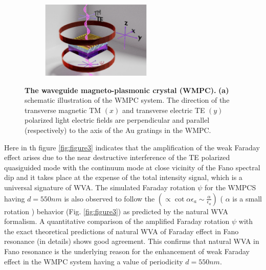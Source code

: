 \documentclass[13pt]{article}
\begin{document}
	\begin{figure}[hbt!]
		\centering
		\begin{subfigure}[]{.49 \linewidth}
			\centering
			\includegraphics[width=\linewidth, height=140px]{Figures/figure1a.png}
		\end{subfigure}
		\caption{\textbf{The waveguide magneto-plasmonic crystal (WMPC).} \textbf{(a)} schematic illustration of the WMPC system. The direction of the transverse magnetic TM $(x)$ and transverse electric TE $(y)$ polarized light electric fields are perpendicular and parallel (respectively) to the axis of the Au gratings in the WMPC.}
		\label{fig:figure1}
	\end{figure}
	\FloatBarrier
	\par
	Here in th figure \ref{fig:figure3} indicates that the amplification of the weak Faraday effect arises due to the near destructive interference of the TE polarized quasiguided mode with the continuum mode at close vicinity of the Fano spectral dip and it takes place at the expense of the total intensity signal, which is a universal signature of WVA. The simulated Faraday rotation $\psi$ for the WMPCS having $d = 550 nm$ is also observed to follow the $(\propto \cot \alpha \epsilon_a  \sim \frac{\alpha}{\epsilon_a})$ ( $\alpha$ is a small rotation ) behavior (Fig. \ref{fig:figure3}) as predicted by the natural WVA formalism. A quantitative comparison of the amplified Faraday rotation $\psi$ with the exact theoretical predictions of natural WVA of Faraday effect in Fano resonance (in details\cite{1.paper}) shows good agreement. This confirms that natural WVA in Fano resonance is the underlying reason for the enhancement of weak Faraday effect in the WMPC system having a value of periodicity $d = 550 nm$.
	
\end{document}
